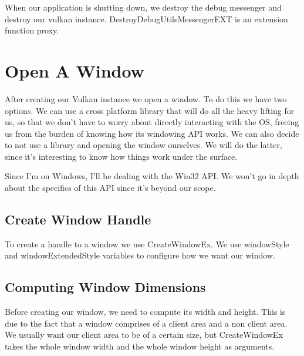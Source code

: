 When our application is shutting down, we destroy the debug messenger
and destroy our vulkan instance. DestroyDebugUtilsMessengerEXT is an extension
function proxy.

\begin{minipage}{\linewidth}{\noindent}
    
\end{minipage}

\section{Open A Window}

After creating our Vulkan instance we open a window.
To do this we have two options.
We can use a cross platform library that will do all the heavy lifting
for us, so that we don't have to worry about directly interacting with the OS,
freeing us from the burden of knowing how its windowing API works.
We can also decide to not use a library and opening the window ourselves.
We will do the latter, since it's interesting to know how things work under the surface.

Since I'm on Windows, I'll be dealing with the Win32 API.
We won't go in depth about the specifics of this API since it's beyond our scope.

\subsection{Create Window Handle}

To create a handle to a window we use CreateWindowEx.
We use windowStyle and windowExtendedStyle variables to configure how we want our window.

\begin{minipage}{\linewidth}{\noindent}
    
\end{minipage}

\subsection{Computing Window Dimensions}

Before creating our window, we need to compute its width and height.
This is due to the fact that a window comprises of a client area and a non client area.
We usually want our client area to be of a certain size, but CreateWindowEx takes
the whole window width and the whole window height as arguments.

